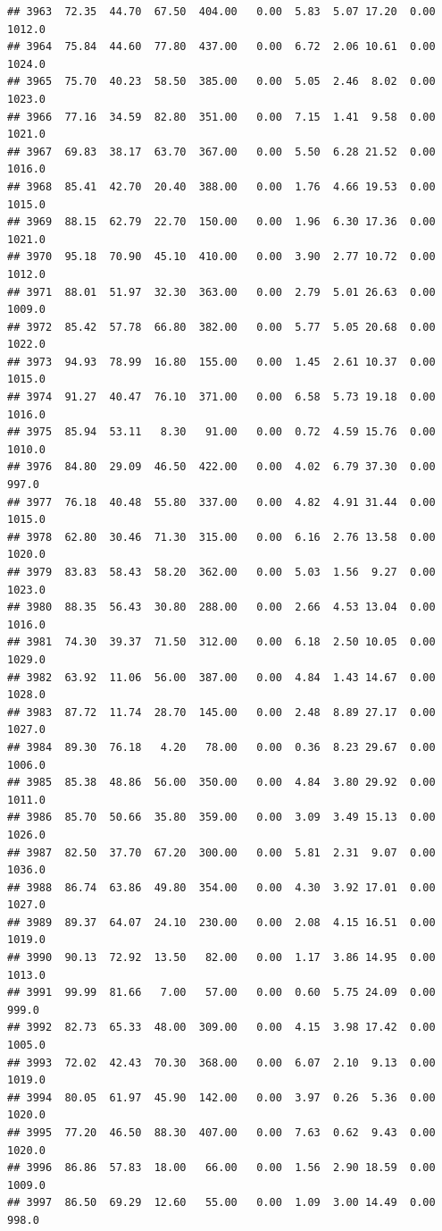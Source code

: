 \documentclass{article}\usepackage{graphicx, color}
\makeatletter
\newenvironment{kframe}{%
 \def\at@end@of@kframe{}%
 \ifinner\ifhmode%
  \def\at@end@of@kframe{\end{minipage}}%
  \begin{minipage}{\columnwidth}%
 \fi\fi%
 \def\FrameCommand##1{\hskip\@totalleftmargin \hskip-\fboxsep
 \colorbox{shadecolor}{##1}\hskip-\fboxsep
     \hskip-\linewidth \hskip-\@totalleftmargin \hskip\columnwidth}%
 \MakeFramed {\advance\hsize-\width
   \@totalleftmargin\z@ \linewidth\hsize
   \@setminipage}}%
 {\par\unskip\endMakeFramed%
 \at@end@of@kframe}
\newenvironment{knitrout}{}{} %
\makeatother
\begin{document}
\begin{knitrout}
\begin{kframe}
\begin{verbatim}
## 3963  72.35  44.70  67.50  404.00   0.00  5.83  5.07 17.20  0.00 1012.0
## 3964  75.84  44.60  77.80  437.00   0.00  6.72  2.06 10.61  0.00 1024.0
## 3965  75.70  40.23  58.50  385.00   0.00  5.05  2.46  8.02  0.00 1023.0
## 3966  77.16  34.59  82.80  351.00   0.00  7.15  1.41  9.58  0.00 1021.0
## 3967  69.83  38.17  63.70  367.00   0.00  5.50  6.28 21.52  0.00 1016.0
## 3968  85.41  42.70  20.40  388.00   0.00  1.76  4.66 19.53  0.00 1015.0
## 3969  88.15  62.79  22.70  150.00   0.00  1.96  6.30 17.36  0.00 1021.0
## 3970  95.18  70.90  45.10  410.00   0.00  3.90  2.77 10.72  0.00 1012.0
## 3971  88.01  51.97  32.30  363.00   0.00  2.79  5.01 26.63  0.00 1009.0
## 3972  85.42  57.78  66.80  382.00   0.00  5.77  5.05 20.68  0.00 1022.0
## 3973  94.93  78.99  16.80  155.00   0.00  1.45  2.61 10.37  0.00 1015.0
## 3974  91.27  40.47  76.10  371.00   0.00  6.58  5.73 19.18  0.00 1016.0
## 3975  85.94  53.11   8.30   91.00   0.00  0.72  4.59 15.76  0.00 1010.0
## 3976  84.80  29.09  46.50  422.00   0.00  4.02  6.79 37.30  0.00  997.0
## 3977  76.18  40.48  55.80  337.00   0.00  4.82  4.91 31.44  0.00 1015.0
## 3978  62.80  30.46  71.30  315.00   0.00  6.16  2.76 13.58  0.00 1020.0
## 3979  83.83  58.43  58.20  362.00   0.00  5.03  1.56  9.27  0.00 1023.0
## 3980  88.35  56.43  30.80  288.00   0.00  2.66  4.53 13.04  0.00 1016.0
## 3981  74.30  39.37  71.50  312.00   0.00  6.18  2.50 10.05  0.00 1029.0
## 3982  63.92  11.06  56.00  387.00   0.00  4.84  1.43 14.67  0.00 1028.0
## 3983  87.72  11.74  28.70  145.00   0.00  2.48  8.89 27.17  0.00 1027.0
## 3984  89.30  76.18   4.20   78.00   0.00  0.36  8.23 29.67  0.00 1006.0
## 3985  85.38  48.86  56.00  350.00   0.00  4.84  3.80 29.92  0.00 1011.0
## 3986  85.70  50.66  35.80  359.00   0.00  3.09  3.49 15.13  0.00 1026.0
## 3987  82.50  37.70  67.20  300.00   0.00  5.81  2.31  9.07  0.00 1036.0
## 3988  86.74  63.86  49.80  354.00   0.00  4.30  3.92 17.01  0.00 1027.0
## 3989  89.37  64.07  24.10  230.00   0.00  2.08  4.15 16.51  0.00 1019.0
## 3990  90.13  72.92  13.50   82.00   0.00  1.17  3.86 14.95  0.00 1013.0
## 3991  99.99  81.66   7.00   57.00   0.00  0.60  5.75 24.09  0.00  999.0
## 3992  82.73  65.33  48.00  309.00   0.00  4.15  3.98 17.42  0.00 1005.0
## 3993  72.02  42.43  70.30  368.00   0.00  6.07  2.10  9.13  0.00 1019.0
## 3994  80.05  61.97  45.90  142.00   0.00  3.97  0.26  5.36  0.00 1020.0
## 3995  77.20  46.50  88.30  407.00   0.00  7.63  0.62  9.43  0.00 1020.0
## 3996  86.86  57.83  18.00   66.00   0.00  1.56  2.90 18.59  0.00 1009.0
## 3997  86.50  69.29  12.60   55.00   0.00  1.09  3.00 14.49  0.00  998.0

\end{verbatim}
\end{kframe}
\end{knitrout}
\end{document}
